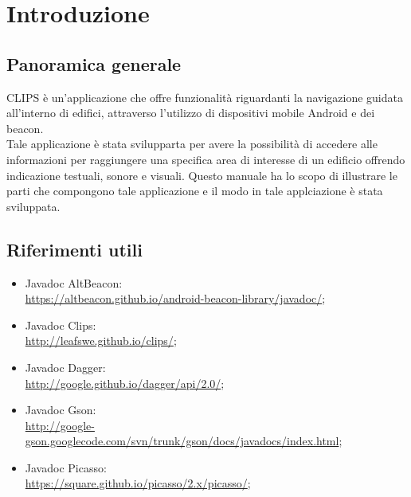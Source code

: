 \documentclass[../ManualeSviluppatore.tex]{subfiles}
\begin{document}
\section{Introduzione}
	\subsection{Panoramica generale}
	CLIPS è un'applicazione che offre funzionalità riguardanti la navigazione guidata all'interno di edifici, attraverso l'utilizzo di dispositivi mobile Android e dei beacon. \\
	Tale applicazione è stata svilupparta per avere la possibilità di accedere alle informazioni per raggiungere una specifica area di interesse di un edificio offrendo indicazione testuali, sonore e visuali.
	Questo manuale ha lo scopo di illustrare le parti che compongono tale applicazione e il modo in tale applciazione è stata sviluppata.
	\subsection{Riferimenti utili}
		\begin{itemize}
			\item Javadoc AltBeacon: \\ \url{https://altbeacon.github.io/android-beacon-library/javadoc/};
			\item Javadoc Clips: \\ \url{http://leafswe.github.io/clips/};
			\item Javadoc Dagger: \\ \url{http://google.github.io/dagger/api/2.0/};
			\item Javadoc Gson: \\ \url{http://google-gson.googlecode.com/svn/trunk/gson/docs/javadocs/index.html};
			\item Javadoc Picasso: \\ \url{https://square.github.io/picasso/2.x/picasso/};

		\end{itemize}
\end{document}
